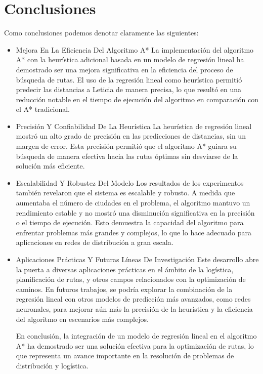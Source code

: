 \documentclass[conference]{IEEEtran}
\begin{document}
	\section{Conclusiones}
	
	Como conclusiones podemos denotar claramente las siguientes:
	\begin{itemize}
	
	\item Mejora En La Eficiencia Del Algoritmo A*
	La implementación del algoritmo A* con la heurística adicional basada en un modelo de regresión lineal ha demostrado ser una mejora significativa en la eficiencia del proceso de búsqueda de rutas. El uso de la regresión lineal como heurística permitió predecir las distancias a Leticia de manera precisa, lo que resultó en una reducción notable en el tiempo de ejecución del algoritmo en comparación con el A* tradicional.
	
	\item Precisión Y Confiabilidad De La Heurística
	La heurística de regresión lineal mostró un alto grado de precisión en las predicciones de distancias, sin un margen de error. Esta precisión permitió que el algoritmo A* guiara su búsqueda de manera efectiva hacia las rutas óptimas sin desviarse de la solución más eficiente.
	
	\item Escalabilidad Y Robustez Del Modelo
	Los resultados de los experimentos también revelaron que el sistema es escalable y robusto. A medida que aumentaba el número de ciudades en el problema, el algoritmo mantuvo un rendimiento estable y no mostró una disminución significativa en la precisión o el tiempo de ejecución. Esto demuestra la capacidad del algoritmo para enfrentar problemas más grandes y complejos, lo que lo hace adecuado para aplicaciones en redes de distribución a gran escala.
	
	\item Aplicaciones Prácticas Y Futuras Líneas De Investigación
	Este desarrollo abre la puerta a diversas aplicaciones prácticas en el ámbito de la logística, planificación de rutas, y otros campos relacionados con la optimización de caminos. En futuros trabajos, se podría explorar la combinación de la regresión lineal con otros modelos de predicción más avanzados, como redes neuronales, para mejorar aún más la precisión de la heurística y la eficiencia del algoritmo en escenarios más complejos.
	
	En conclusión, la integración de un modelo de regresión lineal en el algoritmo A* ha demostrado ser una solución efectiva para la optimización de rutas, lo que representa un avance importante en la resolución de problemas de distribución y logística.
	
	\end{itemize}
	
\end{document}
